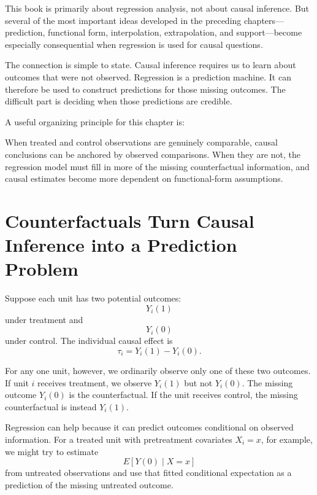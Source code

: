 \documentclass[11pt]{report}
\begin{document}
This book is primarily about regression analysis, not about causal inference. But several of the most important ideas developed in the preceding chapters---prediction, functional form, interpolation, extrapolation, and support---become especially consequential when regression is used for causal questions.

The connection is simple to state. Causal inference requires us to learn about outcomes that were not observed. Regression is a prediction machine. It can therefore be used to construct predictions for those missing outcomes. The difficult part is deciding when those predictions are credible.

A useful organizing principle for this chapter is:

\begin{center}
\end{center}

When treated and control observations are genuinely comparable, causal conclusions can be anchored by observed comparisons. When they are not, the regression model must fill in more of the missing counterfactual information, and causal estimates become more dependent on functional-form assumptions.

\section{Counterfactuals Turn Causal Inference into a Prediction Problem}

Suppose each unit has two potential outcomes:
\[
Y_i(1)
\]
under treatment and
\[
Y_i(0)
\]
under control. The individual causal effect is
\[
\tau_i=Y_i(1)-Y_i(0).
\]

For any one unit, however, we ordinarily observe only one of these two outcomes. If unit \(i\) receives treatment, we observe \(Y_i(1)\) but not \(Y_i(0)\). The missing outcome \(Y_i(0)\) is the counterfactual. If the unit receives control, the missing counterfactual is instead \(Y_i(1)\).

Regression can help because it can predict outcomes conditional on observed information. For a treated unit with pretreatment covariates \(X_i=x\), for example, we might try to estimate
\[
E[Y(0)\mid X=x]
\]
from untreated observations and use that fitted conditional expectation as a prediction of the missing untreated outcome.
\end{document}

